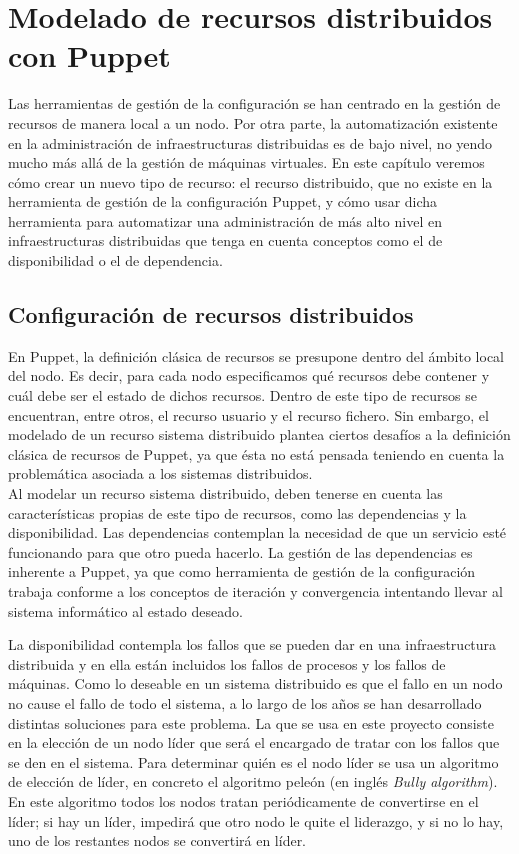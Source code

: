 \chapter{Modelado de recursos distribuidos con Puppet}
\label{cap:modelado}


Las herramientas de gestión de la configuración se han centrado en la gestión de recursos de manera local a un nodo. Por otra parte, la automatización existente en la administración de infraestructuras distribuidas es de bajo nivel, no yendo mucho más allá de la gestión de máquinas virtuales. En este capítulo veremos cómo crear un nuevo tipo de recurso: el recurso distribuido, que no existe en la herramienta de gestión de la configuración Puppet, y cómo usar dicha herramienta para automatizar una administración de más alto nivel en infraestructuras distribuidas que tenga en cuenta conceptos como el de disponibilidad o el de dependencia.


\section{Configuración de recursos distribuidos}

En Puppet, la definición clásica de recursos se presupone dentro del ámbito local del nodo. Es decir, para cada nodo especificamos qué recursos debe contener y cuál debe ser el estado de dichos recursos. Dentro de este tipo de recursos se encuentran, entre otros, el recurso usuario y el recurso fichero. Sin embargo, el modelado de un recurso sistema distribuido plantea ciertos desafíos a la definición clásica de recursos de Puppet, ya que ésta no está pensada teniendo en cuenta la problemática asociada a los sistemas distribuidos. \\

Al modelar un recurso sistema distribuido, deben tenerse en cuenta las características propias de este tipo de recursos, como las dependencias y la disponibilidad. Las dependencias contemplan la necesidad de que un servicio esté funcionando para que otro pueda hacerlo. La gestión de las dependencias es inherente a Puppet, ya que como herramienta de gestión de la configuración trabaja conforme a los conceptos de iteración y convergencia intentando llevar al sistema informático al estado deseado.

La disponibilidad contempla los fallos que se pueden dar en una infraestructura distribuida y en ella están incluidos los fallos de procesos y los fallos de máquinas. Como lo deseable en un sistema distribuido es que el fallo en un nodo no cause el fallo de todo el sistema, a lo largo de los años se han desarrollado distintas soluciones para este problema. La que se usa en este proyecto consiste en la elección de un nodo líder que será el encargado de tratar con los fallos que se den en el sistema. Para determinar quién es el nodo líder se usa un algoritmo de elección de líder, en concreto el algoritmo peleón (en inglés \emph{Bully algorithm}). En este algoritmo todos los nodos tratan periódicamente de convertirse en el líder; si hay un líder, impedirá que otro nodo le quite el liderazgo, y si no lo hay, uno de los restantes nodos se convertirá en líder.

